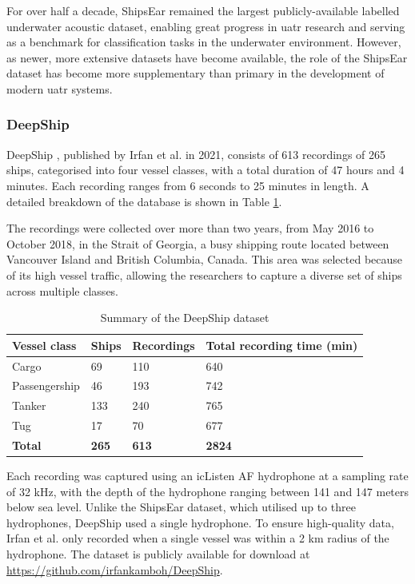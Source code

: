 For over half a decade, ShipsEar remained the largest publicly-available labelled underwater acoustic dataset, enabling great progress in \acrshort{uatr} research and serving as a benchmark for classification tasks in the underwater environment. However, as newer, more extensive datasets have become available, the role of the ShipsEar dataset has become more supplementary than primary in the development of modern \acrshort{uatr} systems.

\subsubsection{DeepShip}\label{subsubsec:deepship}

DeepShip \cite{irfan_deepship_2021}, published by Irfan et al. in 2021, consists of 613 recordings of 265 ships, categorised into four vessel classes, with a total duration of 47 hours and 4 minutes. Each recording ranges from 6 seconds to 25 minutes in length. A detailed breakdown of the database is shown in Table \ref{tab:deepship-summary}.

The recordings were collected over more than two years, from May 2016 to October 2018, in the Strait of Georgia, a busy shipping route located between Vancouver Island and British Columbia, Canada. This area was selected because of its high vessel traffic, allowing the researchers to capture a diverse set of ships across multiple classes.

\begin{table}[htbp]
\centering
\begin{tabular}{llll}
\toprule
\textbf{Vessel class} & \textbf{Ships} & \textbf{Recordings} & \textbf{Total recording time (min)} \\ \midrule
Cargo           & 69  & 110   & 640 \\
Passengership   & 46  & 193   & 742 \\
Tanker          & 133 & 240   & 765 \\
Tug             & 17  & 70    & 677 \\
\textbf{Total}  & \textbf{265} & \textbf{613} & \textbf{2824} \\ \bottomrule
\end{tabular}
\caption{Summary of the DeepShip dataset}
\label{tab:deepship-summary}
\end{table}

Each recording was captured using an icListen AF hydrophone at a sampling rate of 32 kHz, with the depth of the hydrophone ranging between 141 and 147 meters below sea level. Unlike the ShipsEar dataset, which utilised up to three hydrophones, DeepShip used a single hydrophone. To ensure high-quality data, Irfan et al. only recorded when a single vessel was within a 2 km radius of the hydrophone. The dataset is publicly available for download at \url{https://github.com/irfankamboh/DeepShip}.

